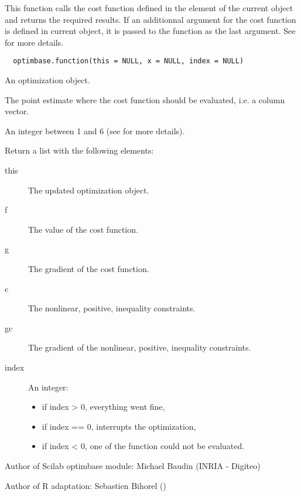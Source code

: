 %
\begin{Description}\relax
This function calls the cost function defined in the  element of
the current object and returns the required results. If an additionnal
argument for the cost function is defined in current object, it is passed to
the function as the last argument. See 
 for more details.
\end{Description}
%
\begin{Usage}
\begin{verbatim}
  optimbase.function(this = NULL, x = NULL, index = NULL)
\end{verbatim}
\end{Usage}
%
\begin{Arguments}
\begin{ldescription}
\item[\code{this}] An optimization object.
\item[\code{x}] The point estimate where the cost function should be evaluated, i.e.
a column vector.
\item[\code{index}] An integer between 1 and 6 (see
 for more details).
\end{ldescription}
\end{Arguments}
%
\begin{Value}
Return a list with the following elements: \begin{description}

\item[this] The updated optimization object.
\item[f] The value of the cost function.
\item[g] The gradient of the cost function.
\item[c] The nonlinear, positive, inequality constraints.
\item[gc] The gradient of the nonlinear, positive, inequality constraints.
\item[index] An integer: \begin{itemize}

\item if index > 0, everything went fine,
\item if index == 0, interrupts the optimization,
\item if index < 0, one of the function could not be evaluated.
\end{itemize}



\end{description}

\end{Value}
%
\begin{Author}\relax
Author of Scilab optimbase module: Michael Baudin (INRIA - Digiteo)

Author of R adaptation: Sebastien Bihorel ()
\end{Author}
